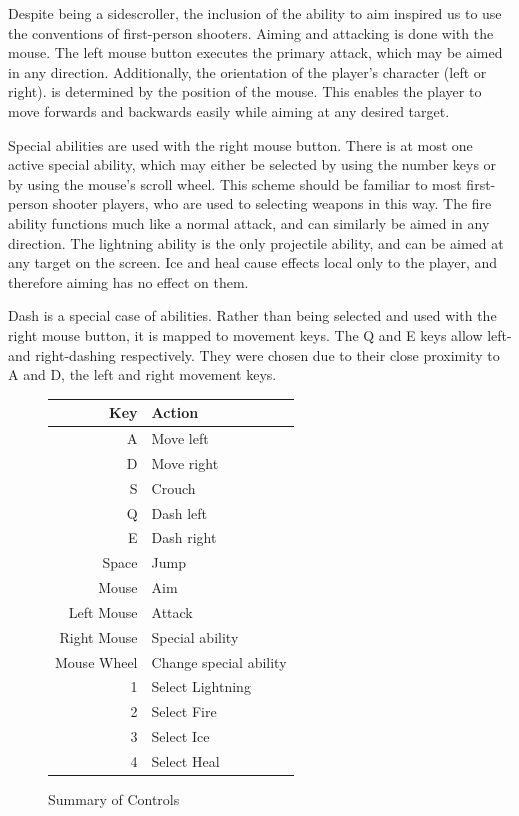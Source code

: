 \documentclass{article}
\begin{document}
Despite being a sidescroller, the inclusion of the ability to aim inspired us to use the conventions of first-person shooters.  Aiming and attacking is done with the mouse.  The left mouse button executes the primary attack, which may be aimed in any direction.  Additionally, the orientation of the player's character (left or right).  is determined by the position of the mouse.  This enables the player to move forwards and backwards easily while aiming at any desired target.

Special abilities are used with the right mouse button.  There is at most one active special ability, which may either be selected by using the number keys or by using the mouse's scroll wheel.  This scheme should be familiar to most first-person shooter players, who are used to selecting weapons in this way.  The fire ability functions much like a normal attack, and can similarly be aimed in any direction.  The lightning ability is the only projectile ability, and can be aimed at any target on the screen.  Ice and heal cause effects local only to the player, and therefore aiming has no effect on them.

Dash is a special case of abilities.  Rather than being selected and used with the right mouse button, it is mapped to movement keys.  The Q and E keys allow left- and right-dashing respectively.  They were chosen due to their close proximity to A and D, the left and right movement keys.

\begin{figure}[h!]
\begin{tabular}{|r|l|}
\hline
Key & Action \\
\hline
A & Move left \\
D & Move right \\
S & Crouch \\
Q & Dash left \\
E & Dash right \\
Space & Jump \\
Mouse & Aim \\
Left Mouse & Attack \\
Right Mouse & Special ability \\
Mouse Wheel & Change special ability \\
1 & Select Lightning \\
2 & Select Fire \\
3 & Select Ice \\
4 & Select Heal \\
\hline
\end{tabular}
\caption{Summary of Controls}
\label{ControlsTable}
\end{figure}
\end{document}

